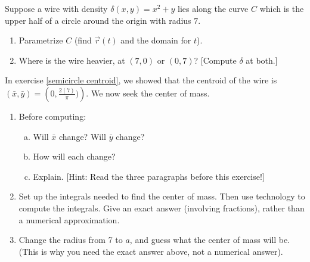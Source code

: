 \begin{challenge}
%
Suppose a wire with density $\delta(x,y)=x^2+y$ lies along the curve $C$ which is the upper half of a circle around the origin with radius $7$.
\begin{enumerate}
	\item Parametrize $C$ (find $\vec r(t)$ and the domain for $t$).
	\item Where is the wire heavier, at $(7,0)$ or $(0,7)$? [Compute $\delta$ at both.]
\end{enumerate}
In exercise \ref{semicircle centroid}, we showed that the centroid of the wire is $(\bar x, \bar y) = \left(0,\frac{2(7)}{\pi})\right)$.  We now seek the center of mass. 
\begin{enumerate}[resume]
	\item Before computing:
	\begin{enumerate}[a)]
		\item Will $\bar x$ change? Will $\bar y$ change?  
		\item How will each change? 
		\item Explain. [Hint: Read the three paragraphs before this exercise!]
	\end{enumerate}
	\item Set up the integrals needed to find the center of mass. Then use technology to compute the integrals. Give an exact answer (involving fractions), rather than a numerical approximation.
	\item Change the radius from 7 to $a$, and guess what the center of mass will be.  (This is why you need the exact answer above, not a numerical answer).
\end{enumerate}
\end{challenge}



